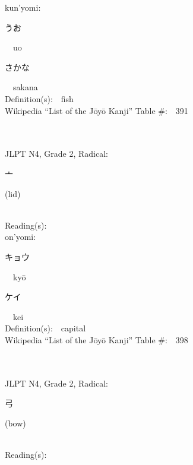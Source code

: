 \begin{multicols}{2}
{\hspace*{1em}}kun'yomi:\ \ \\
{\hspace*{2em}}{\begin{CJK}{UTF8}{min} うお \end{CJK}}\ \ uo\ \ \\
{\hspace*{2em}}{\begin{CJK}{UTF8}{min} さかな \end{CJK}}\ \ sakana\ \ \\
Definition(s):\ \ fish \\
Wikipedia ``List of the J\=oy\=o Kanji'' Table \#:\ \ 391 \\
\ \ \\
{\fontsize{34pt}{40pt}  }\ \ \\  %
{JLPT N4, Grade 2, Radical:\ \ {\begin{CJK}{UTF8}{min} 亠 \end{CJK}} (lid) } \\
Reading(s):\ \ \\
{\hspace*{1em}}on'yomi:\ \ \\
{\hspace*{2em}}{\begin{CJK}{UTF8}{min} キョウ \end{CJK}}\ \ ky\=o\ \ \\
{\hspace*{2em}}{\begin{CJK}{UTF8}{min} ケイ \end{CJK}}\ \ kei\ \ \\
Definition(s):\ \ capital \\
Wikipedia ``List of the J\=oy\=o Kanji'' Table \#:\ \ 398 \\
\ \ \\
{\fontsize{34pt}{40pt}  }\ \ \\  %
{JLPT N4, Grade 2, Radical:\ \ {\begin{CJK}{UTF8}{min} 弓 \end{CJK}} (bow) } \\
Reading(s):\ \ \\

\end{multicols}
